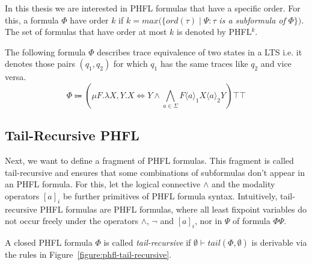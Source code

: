 In this thesis we are interested in PHFL formulas that have a specific order. For this, a formula $\Phi$ have order $k$
if $k = max(\{ord(\tau)\mid \Psi \colon \tau$ \textit{is a subformula of} $\Phi\})$. The set of formulas that have
order at most $k$ is denoted by PHFL$^k$.

\begin{example}{\cite{lange2014capturing}}
    \label{example:phfl}
    The following formula $\Phi$ describes trace equivalence of two states in a LTS i.e. it denotes those pairs $
    (q_1, q_2)$ for which $q_1$ has the same traces like $q_2$ and vice versa.
    \[\Phi \Coloneqq (\mu F. \lambda X, Y. X \Leftrightarrow Y \wedge \underset{a \in \Sigma}{\bigwedge} F \langle a
    \rangle_1 X \langle a \rangle_2 Y)\top \top\]
\end{example}

\subsection{Tail-Recursive PHFL}\label{subsec:tail-recursivePhfl}

Next, we want to define a fragment of PHFL formulas. This fragment is called tail-recursive and ensures that
some combinations of subformulas don't appear in an PHFL formula. For this, let the logical connective
$\wedge$ and the modality operators $[a]_i$ be further primitives of PHFL formula syntax. Intuitively, tail-recursive
PHFL formulas are PHFL formulas, where all least fixpoint variables do not occur freely under the operators
$\wedge$, $\neg$ and $[a]_i$, nor in $\Psi$ of formula $\Phi\Psi$.

\begin{definition}
    A closed PHFL formula $\Phi$ is called \emph{tail-recursive} if $\emptyset \vdash tail(\Phi, \emptyset)$ is
    derivable via the rules in Figure~\ref{figure:phfl-tail-recursive}.
\end{definition}

